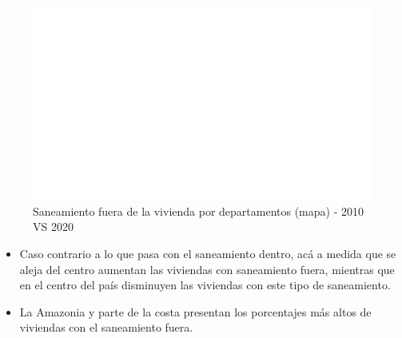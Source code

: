     \begin{figure}[H]
        \caption{Saneamiento fuera de la vivienda por departamentos (mapa) - 2010 VS 2020 \label{map_result_2} }
        \begin{center}
        \includegraphics[width=\textwidth,keepaspectratio]{img/var_195_map.png}
        \end{center}
    \end{figure}
            \begin{itemize}
                    \item Caso contrario a lo que pasa con el saneamiento dentro, acá a medida que se aleja del centro aumentan las viviendas con saneamiento fuera, mientras que en el centro del país disminuyen las viviendas con este tipo de saneamiento.
                    \item La Amazonia y parte de la costa presentan los porcentajes más altos de viviendas con el saneamiento fuera.
                    \end{itemize}


